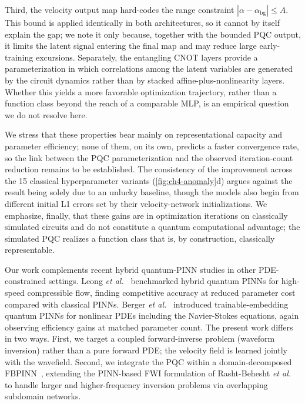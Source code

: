 Third, the velocity output map hard-codes the range constraint $|\alpha-\alpha_\text{bg}|\leq A$. This bound is applied identically in both architectures, so it cannot by itself explain the gap; we note it only because, together with the bounded PQC output, it limits the latent signal entering the final map and may reduce large early-training excursions. Separately, the entangling CNOT layers provide a parameterization in which correlations among the latent variables are generated by the circuit dynamics rather than by stacked affine-plus-nonlinearity layers. Whether this yields a more favorable optimization trajectory, rather than a function class beyond the reach of a comparable MLP, is an empirical question we do not resolve here.

We stress that these properties bear mainly on representational capacity and parameter efficiency; none of them, on its own, predicts a faster convergence rate, so the link between the PQC parameterization and the observed iteration-count reduction remains to be established. The consistency of the improvement across the 15 classical hyperparameter variants (\ref{fig:ch4-anomaly}d) argues against the result being solely due to an unlucky baseline, though the models also begin from different initial L1 errors set by their velocity-network initializations. We emphasize, finally, that these gains are in optimization iterations on classically simulated circuits and do not constitute a quantum computational advantage; the simulated PQC realizes a function class that is, by construction, classically representable.

Our work complements recent hybrid quantum-PINN studies in other PDE-constrained settings. Leong \emph{et al.}~\cite{LEONG2025106782} benchmarked hybrid quantum PINNs for high-speed compressible flow, finding competitive accuracy at reduced parameter cost compared with classical PINNs. Berger \emph{et al.}~\cite{Berger2025} introduced trainable-embedding quantum PINNs for nonlinear PDEs including the Navier-Stokes equations, again observing efficiency gains at matched parameter count. The present work differs in two ways. First, we target a coupled forward-inverse problem (waveform inversion) rather than a pure forward PDE; the velocity field is learned jointly with the wavefield. Second, we integrate the PQC within a domain-decomposed FBPINN~\cite{Moseley2023}, extending the PINN-based FWI formulation of Rasht-Behesht \emph{et al.}~\cite{rahst} to handle larger and higher-frequency inversion problems via overlapping subdomain networks.

